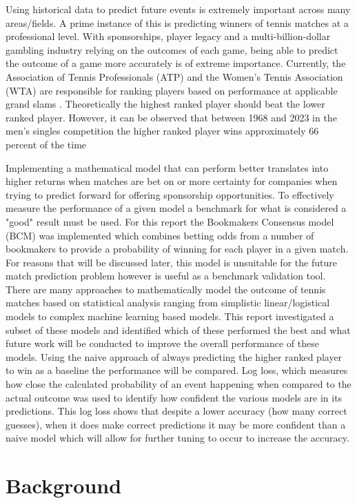 \documentclass[12pt,a4paper]{article}
\begin{document}
Using historical data to predict future events is extremely important across many
areas/fields. A prime instance of this is predicting winners of tennis matches at
a professional level. With sponsorships, player legacy and a multi-billion-dollar
gambling industry relying on the outcomes of each game, being able to predict the
outcome of a game more accurately is of extreme importance. Currently, the
Association of Tennis Professionals (ATP) and the Women's Tennis Association
(WTA) are responsible for ranking players based on performance at applicable
grand slams \cite{nag_tennis_2022}.  Theoretically the highest ranked player should beat
the lower ranked player. However, it can be observed that between 1968 and 2023
in the men's singles competition the higher ranked player wins approximately 66
percent of the time

Implementing a mathematical model that can perform better translates into higher
returns when matches are bet on or more certainty for companies when trying to
predict forward for offering sponsorship opportunities. To effectively measure
the performance of a given model a benchmark for what is considered a "good" result
must be used. For this report the Bookmakers Consensus model (BCM) was implemented which
combines betting odds from a number of bookmakers to provide a probability of winning
for each player in a given match. For reasons that will be discussed later, this
model is unsuitable for the future match prediction problem however is useful as a
benchmark validation tool.
There are many approaches to mathematically model the outcome of tennis matches based on statistical analysis
ranging from simplistic linear/logistical models to complex machine learning
based models. This report investigated a subset of these models and identified
which of these performed the best and what future work will be conducted to
improve the overall performance of these models. Using the naive approach of
always predicting the higher ranked player to win as a baseline the performance
will be compared. Log loss, which measures how close the calculated probability
of an event happening when compared to the actual outcome was used to identify
how confident the various models are in its predictions. This log loss shows that despite
a lower accuracy (how many correct guesses), when it does make correct
predictions it may be more confident than a naive model which will allow for
further tuning to occur to increase the accuracy.
\noindent \hrulefill

\clearpage
\section{Background}
\end{document}
